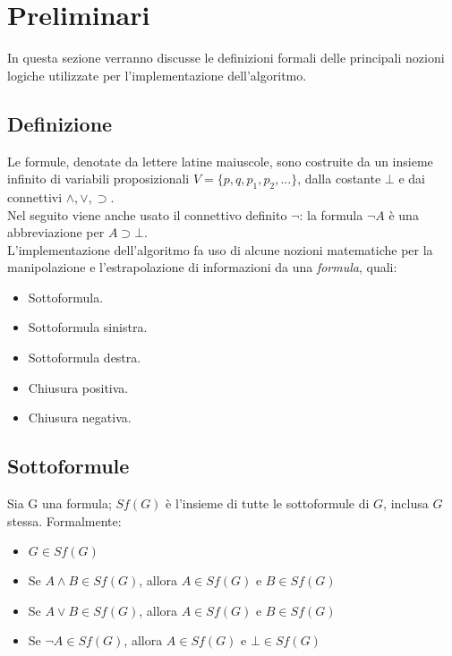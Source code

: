 \documentclass[\main/tesi.tex]{subfiles}
\begin{document}
\chapter{Preliminari}

In questa sezione verranno discusse le definizioni formali delle principali nozioni logiche utilizzate per l'implementazione dell'algoritmo.

\section{Definizione}

Le formule, denotate da lettere latine maiuscole, sono costruite da un insieme infinito di variabili proposizionali $V = \{p,q,p_1,p_2,...\}$, dalla costante $\bot$ e dai connettivi $\land, \lor, \supset$. \\
Nel seguito viene anche usato il connettivo definito $\neg$: la formula $\neg A$ è una abbreviazione per $A \supset \bot$. \\

L'implementazione dell'algoritmo fa uso di alcune nozioni matematiche per la manipolazione e l'estrapolazione di informazioni da una \textit{formula}, quali: \\
\begin{itemize}
    \item Sottoformula.
    \item Sottoformula sinistra.
    \item Sottoformula destra.
    \item Chiusura positiva.
    \item Chiusura negativa.
\end{itemize}

\newpage

\section{Sottoformule}

Sia G una formula; $Sf(G)$ è l'insieme di tutte le sottoformule di $G$, inclusa $G$ stessa.
Formalmente:
\begin{itemize}
    \item $G \in Sf(G)$
    \item Se $A \land B \in Sf(G)$, allora $A \in Sf(G)$ e $B \in Sf(G)$
    \item Se $A \lor B \in Sf(G)$, allora $A \in Sf(G)$ e $B \in Sf(G)$
    \item Se $\neg A \in Sf(G)$, allora $A \in Sf(G)$ e $\bot \in Sf(G)$
\end{itemize}
\end{document}

